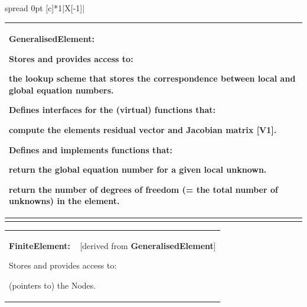 \begin{center}\tabulinesep=1mm
\begin{longtabu} spread 0pt [c]{*{1}{|X[-1]}|}
\hline
\begin{center} \begin{tabularx}{\linewidth}{|*{1}{>{\raggedright\arraybackslash}X|}}\hline
\begin{center} {\bfseries Generalised\+Element\+:} \end{center} 
\begin{DoxyItemize}
\item Stores and provides access to\+:
\begin{DoxyItemize}
\item the lookup scheme that stores the correspondence between local and global equation numbers.
\end{DoxyItemize}
\item Defines interfaces for the (virtual) functions that\+:
\begin{DoxyItemize}
\item compute the element\textquotesingle{}s residual vector and Jacobian matrix \mbox{[}{\bfseries V1}\mbox{]}.
\end{DoxyItemize}
\item Defines and implements functions that\+:
\begin{DoxyItemize}
\item return the global equation number for a given local unknown.
\item return the number of degrees of freedom (= the total number of unknowns) in the element.   
\end{DoxyItemize}
\end{DoxyItemize}\\\cline{1-1}
\end{tabularx}
\end{center}  \begin{center} \begin{tabularx}{\linewidth}{|*{1}{>{\raggedright\arraybackslash}X|}}\hline
\begin{center} {\bfseries Finite\+Element\+:} ~\newline
\mbox{[}derived from {\bfseries Generalised\+Element}\mbox{]} \end{center} 
\begin{DoxyItemize}
\item Stores and provides access to\+:
\begin{DoxyItemize}
\item (pointers to) the {\ttfamily Nodes}.

\end{DoxyItemize}
\end{DoxyItemize}
\end{tabularx}
\end{center}
\end{longtabu}
\end{center}
